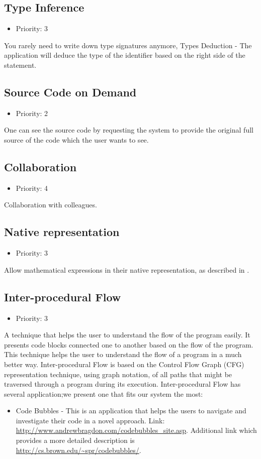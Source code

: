 \subsection{Type Inference}
\begin{itemize}
	\item Priority: 3
\end{itemize}
You rarely need to write down type signatures anymore, Types Deduction - The application will deduce the type of the identifier based on the right side of the statement.
\subsection{Source Code on Demand}
\begin{itemize}
	\item Priority: 2
\end{itemize}
One can see the source code by requesting the system to provide the original full source of the code which the user wants to see.
\subsection{Collaboration}
\begin{itemize}
	\item Priority: 4
\end{itemize}
Collaboration with colleagues.
\subsection{Native representation}
\begin{itemize}
	\item Priority: 3
\end{itemize}
Allow mathematical expressions in their native representation, as described in \citet{andrew08}.
\subsection{Inter-procedural Flow}
\begin{itemize}
	\item Priority: 3
\end{itemize}
A technique that helps the user to understand the flow of the program easily.  It presents code blocks connected one to another based on the flow of the program. This technique helps the user to understand the flow of a program in a much better way. Inter-procedural Flow is based on the Control Flow Graph (CFG) representation technique, using graph notation, of all paths that might be traversed through a program during its execution. Inter-procedural Flow has several application;we present one that fits our system the most:
\begin{itemize}
	\item Code Bubbles - This is an application that helps the users to navigate and investigate their code in a novel approach. Link: \url{http://www.andrewbragdon.com/codebubbles\_site.asp}. Additional link which provides a more detailed description is \url{http://cs.brown.edu/~spr/codebubbles/}.
\end{itemize}
